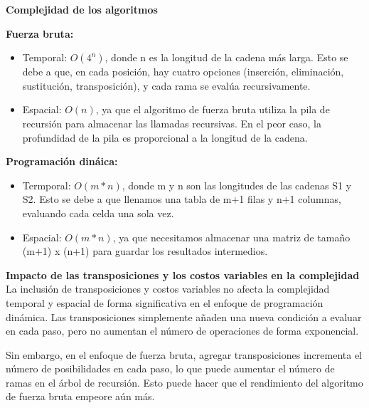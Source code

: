 \noindent \textbf{\large{Complejidad de los algoritmos}}

\textbf{Fuerza bruta:}
\begin{itemize}
    \item Temporal: $O(4^n)$, donde n es la longitud de la cadena más larga. Esto se debe a que, en cada posición, hay cuatro opciones (inserción, eliminación, sustitución, transposición), y cada rama se evalúa recursivamente.

    \item Espacial: $O(n)$, ya que el algoritmo de fuerza bruta utiliza la pila de recursión para almacenar las llamadas recursivas. En el peor caso, la profundidad de la pila es proporcional a la longitud de la cadena.
\end{itemize}

\textbf{Programación dináica:}
\begin{itemize}
    \item Termporal: $O(m * n)$, donde m y n son las longitudes de las cadenas S1 y S2. Esto se debe a que llenamos una tabla de m+1 filas y n+1 columnas, evaluando cada celda una sola vez.

    \item Espacial: $O(m * n)$, ya que necesitamos almacenar una matriz de tamaño (m+1) x (n+1) para guardar los resultados intermedios.
\end{itemize}

\newpage
\noindent \textbf{\large{Impacto de las transposiciones y los costos variables en la complejidad}}\\

La inclusión de transposiciones y costos variables no afecta la complejidad temporal y espacial de forma significativa en el enfoque de programación dinámica. Las transposiciones simplemente añaden una nueva condición a evaluar en cada paso, pero no aumentan el número de operaciones de forma exponencial.

\noindent Sin embargo, en el enfoque de fuerza bruta, agregar transposiciones incrementa el número de posibilidades en cada paso, lo que puede aumentar el número de ramas en el árbol de recursión. Esto puede hacer que el rendimiento del algoritmo de fuerza bruta empeore aún más.
